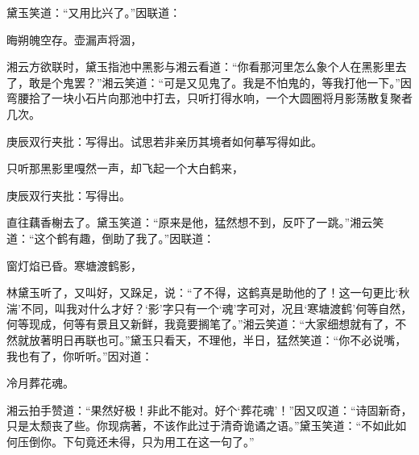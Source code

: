 \begin{parag}

    黛玉笑道：“又用比兴了。”因联道：
\end{parag}
\begin{poem}
    \begin{pl}
        晦朔魄空存。壶漏声将涸，
    \end{pl}
\end{poem}

\begin{parag}

    湘云方欲联时，黛玉指池中黑影与湘云看道：“你看那河里怎么象个人在黑影里去了，敢是个鬼罢？”湘云笑道：“可是又见鬼了。我是不怕鬼的，等我打他一下。”因弯腰拾了一块小石片向那池中打去，只听打得水响，一个大圆圈将月影荡散复聚者几次。\begin{note}庚辰双行夹批：写得出。试思若非亲历其境者如何摹写得如此。\end{note}只听那黑影里嘎然一声，却飞起一个大白鹤来，\begin{note}庚辰双行夹批：写得出。\end{note}直往藕香榭去了。黛玉笑道：“原来是他，猛然想不到，反吓了一跳。”湘云笑道：“这个鹤有趣，倒助了我了。”因联道：
\end{parag}
\begin{poem}
    \begin{pl}

        窗灯焰已昏。寒塘渡鹤影，

    \end{pl}
\end{poem}

\begin{parag}

    林黛玉听了，又叫好，又跺足，说：“了不得，这鹤真是助他的了！这一句更比‘秋湍’不同，叫我对什么才好？‘影’字只有一个‘魂’字可对，况且‘寒塘渡鹤’何等自然，何等现成，何等有景且又新鲜，我竟要搁笔了。”湘云笑道：“大家细想就有了，不然就放著明日再联也可。”黛玉只看天，不理他，半日，猛然笑道：“你不必说嘴，我也有了，你听听。”因对道：
\end{parag}

\begin{poem}
    \begin{pl}
        冷月葬花魂。
    \end{pl}
\end{poem}

\begin{parag}

    湘云拍手赞道：“果然好极！非此不能对。好个‘葬花魂’！”因又叹道：“诗固新奇，只是太颓丧了些。你现病著，不该作此过于清奇诡谲之语。”黛玉笑道：“不如此如何压倒你。下句竟还未得，只为用工在这一句了。”
\end{parag}


